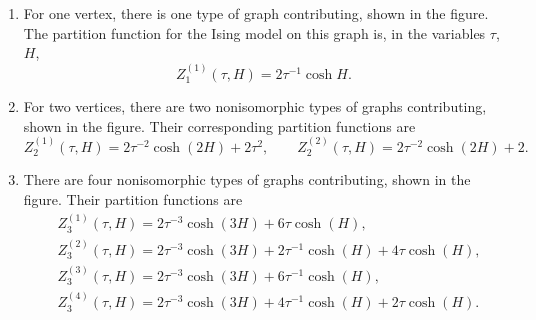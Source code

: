 \documentclass[10pt,a4paper]{amsart}
\numberwithin{equation}{section}
\begin{document}
\begin{enumerate}\setlength{\leftskip}{0.35cm}\itemsep=0pt
 \item[$V=1$.] For one vertex, there is one type of graph contributing, shown in the figure. The partition function for the Ising model on this graph is, in the variables $\tau$, $H$,
 \begin{equation*}
 Z_1^{(1)}(\tau,H) = 2\tau^{-1}\cosh H.
 \end{equation*}
 \item[$V=2$.] For two vertices, there are two nonisomorphic types of graphs contributing, shown in the figure. Their corresponding partition functions are
 \begin{equation*}
 Z_2^{(1)}(\tau,H) = 2\tau^{-2} \cosh(2H) + 2\tau^2, \qquad Z_2^{(2)}(\tau,H) = 2\tau^{-2}\cosh(2H) + 2.
 \end{equation*}
 \item[$V=3$.] There are four nonisomorphic types of graphs contributing, shown in the figure. Their partition functions are
 \begin{align*}
 &Z_3^{(1)}(\tau,H)= 2\tau^{-3}\cosh(3H)+6\tau\cosh(H),\nonumber\\
 &Z_3^{(2)}(\tau,H)= 2\tau^{-3}\cosh(3H) + 2\tau^{-1}\cosh(H) + 4\tau \cosh(H),\\
 &Z_3^{(3)}(\tau,H)= 2\tau^{-3}\cosh(3H)+6\tau^{-1}\cosh(H), \nonumber\\
 &Z_3^{(4)}(\tau,H)= 2\tau^{-3}\cosh(3H) + 4\tau^{-1}\cosh(H) + 2\tau \cosh(H).\nonumber
 \end{align*}
\end{enumerate}
\end{document}
